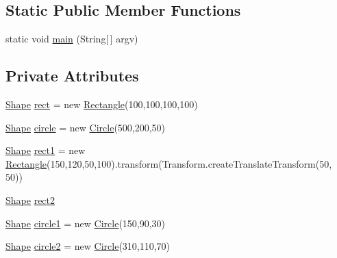 \subsection*{Static Public Member Functions}
\begin{DoxyCompactItemize}
\item 
static void \mbox{\hyperlink{classorg_1_1newdawn_1_1slick_1_1tests_1_1_geom_test_a5978e27fffbc552a4f868521384d158c}{main}} (String\mbox{[}$\,$\mbox{]} argv)
\end{DoxyCompactItemize}
\subsection*{Private Attributes}
\begin{DoxyCompactItemize}
\item 
\mbox{\hyperlink{classorg_1_1newdawn_1_1slick_1_1geom_1_1_shape}{Shape}} \mbox{\hyperlink{classorg_1_1newdawn_1_1slick_1_1tests_1_1_geom_test_a758ee9c95f74edec4a31bc3b8e303cde}{rect}} = new \mbox{\hyperlink{classorg_1_1newdawn_1_1slick_1_1geom_1_1_rectangle}{Rectangle}}(100,100,100,100)
\item 
\mbox{\hyperlink{classorg_1_1newdawn_1_1slick_1_1geom_1_1_shape}{Shape}} \mbox{\hyperlink{classorg_1_1newdawn_1_1slick_1_1tests_1_1_geom_test_adb8595b3dd3956c9885a33c2851b0a84}{circle}} = new \mbox{\hyperlink{classorg_1_1newdawn_1_1slick_1_1geom_1_1_circle}{Circle}}(500,200,50)
\item 
\mbox{\hyperlink{classorg_1_1newdawn_1_1slick_1_1geom_1_1_shape}{Shape}} \mbox{\hyperlink{classorg_1_1newdawn_1_1slick_1_1tests_1_1_geom_test_a2d04438f8f41827e625babf80383948d}{rect1}} = new \mbox{\hyperlink{classorg_1_1newdawn_1_1slick_1_1geom_1_1_rectangle}{Rectangle}}(150,120,50,100).transform(Transform.\+create\+Translate\+Transform(50, 50))
\item 
\mbox{\hyperlink{classorg_1_1newdawn_1_1slick_1_1geom_1_1_shape}{Shape}} \mbox{\hyperlink{classorg_1_1newdawn_1_1slick_1_1tests_1_1_geom_test_a6fb3662ef49d1cb417105d0e507a61cc}{rect2}}
\item 
\mbox{\hyperlink{classorg_1_1newdawn_1_1slick_1_1geom_1_1_shape}{Shape}} \mbox{\hyperlink{classorg_1_1newdawn_1_1slick_1_1tests_1_1_geom_test_a6c2628635624ad1566aab135fa63fdcc}{circle1}} = new \mbox{\hyperlink{classorg_1_1newdawn_1_1slick_1_1geom_1_1_circle}{Circle}}(150,90,30)
\item 
\mbox{\hyperlink{classorg_1_1newdawn_1_1slick_1_1geom_1_1_shape}{Shape}} \mbox{\hyperlink{classorg_1_1newdawn_1_1slick_1_1tests_1_1_geom_test_a85946baee82f4456ee261472685cbab3}{circle2}} = new \mbox{\hyperlink{classorg_1_1newdawn_1_1slick_1_1geom_1_1_circle}{Circle}}(310,110,70)

\end{DoxyCompactItemize}
